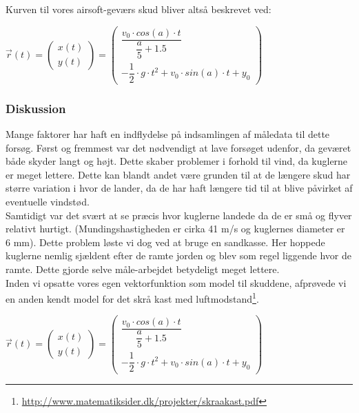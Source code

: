 Kurven til vores airsoft-geværs skud bliver altså beskrevet ved:\\

\begin{center}
\begin{math}
\overrightarrow{r}(t) = 
\begin{pmatrix}
x(t)\\
y(t)
\end{pmatrix}
=
\begin{pmatrix}
\dfrac{v_{0} \cdot cos(a) \cdot t}{\dfrac{a}{5} + 1.5}\\
- \dfrac{1}{2} \cdot g \cdot t^{2} + v_{0} \cdot sin(a) \cdot t + y_{0}
\end{pmatrix}
\end{math}
\end{center}


\subsubsection{Diskussion}

Mange faktorer har haft en indflydelse på indsamlingen af måledata til dette forsøg. Først og fremmest var det nødvendigt at lave forsøget udenfor, da geværet både skyder langt og højt. Dette skaber problemer i forhold til vind, da kuglerne er meget lettere. Dette kan blandt andet være grunden til at de længere skud har større variation i hvor de lander, da de har haft længere tid til at blive påvirket af eventuelle vindstød.\\

Samtidigt var det svært at se præcis hvor kuglerne landede da de er små og flyver relativt hurtigt. (Mundingshastigheden er cirka 41 m/s og kuglernes diameter er 6 mm). Dette problem løste vi dog ved at bruge en sandkasse. Her hoppede kuglerne nemlig sjældent efter de ramte jorden og blev som regel liggende hvor de ramte. Dette gjorde selve måle-arbejdet betydeligt meget lettere.\\

Inden vi opsatte vores egen vektorfunktion som model til skuddene, afprøvede vi en anden kendt model for det skrå kast med luftmodstand\footnote{\url{ http://www.matematiksider.dk/projekter/skraakast.pdf}}.\\

\begin{center}
\begin{math}
\overrightarrow{r}(t) = 
\begin{pmatrix}
x(t)\\
y(t)
\end{pmatrix}
=
\begin{pmatrix}
\dfrac{v_{0} \cdot cos(a) \cdot t}{\dfrac{a}{5} + 1.5}\\
- \dfrac{1}{2} \cdot g \cdot t^{2} + v_{0} \cdot sin(a) \cdot t + y_{0}
\end{pmatrix}
\end{math}
\end{center}

